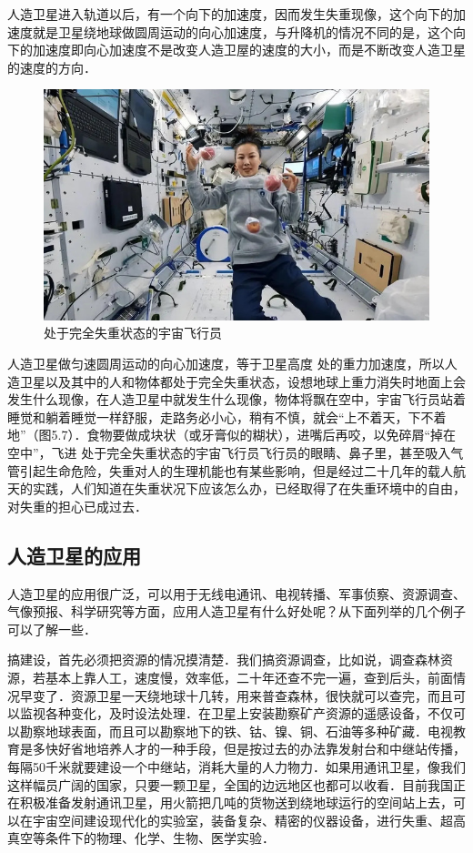 人造卫星进入轨道以后，有一个向下的加速度，因而发生失重现像，这个向下的加速度就是卫星绕地球做圆周运动的向心加速度，与升降机的情况不同的是，这个向下的加速度即向心加速度不是改变人造卫屋的速度的大小，而是不断改变人造卫星的速度的方向．

\begin{figure}[H]
	\centering\includegraphics[scale=0.8]{figure/5-7.jpg}
	\caption{处于完全失重状态的宇宙飞行员}
\end{figure}

人造卫星做匀速圆周运动的向心加速度，等于卫星高度
处的重力加速度，所以人造卫星以及其中的人和物体都处于完全失重状态，设想地球上重力消失时地面上会发生什么现像，在人造卫星中就发生什么现像，物体将飘在空中，宇宙飞行员站着睡觉和躺着睡觉一样舒服，走路务必小心，稍有不慎，就会“上不着天，下不着地”（图5.7）．食物要做成块状（或牙膏似的糊状），进嘴后再咬，以免碎屑“掉在空中”，飞进
处于完全失重状态的宇宙飞行员飞行员的眼睛、鼻子里，甚至吸入气管引起生命危险，失重对人的生理机能也有某些影响，但是经过二十几年的载人航天的实践，人们知道在失重状况下应该怎么办，已经取得了在失重环境中的自由，对失重的担心已成过去．

\subsection{人造卫星的应用}

人造卫星的应用很广泛，可以用于无线电通讯、电视转播、军事侦察、资源调查、气像预报、科学研究等方面，应用人造卫星有什么好处呢？从下面列举的几个例子可以了解一些．

搞建设，首先必须把资源的情况摸清楚．我们搞资源调查，比如说，调查森林资源，若基本上靠人工，速度慢，效率低，二十年还查不完一遍，查到后头，前面情况早变了．资源卫星一天绕地球十几转，用来普查森林，很快就可以查完，而且可
以监视各种变化，及时设法处理．在卫星上安装勘察矿产资源的遥感设备，不仅可以勘察地球表面，而且可以勘察地下的铁、钴、镍、铜、石油等多种矿藏．电视教育是多快好省地培养人才的一种手段，但是按过去的办法靠发射台和中继站传播，每隔50千米就要建设一个中继站，消耗大量的人力物力．如果用通讯卫星，像我们这样幅员广阔的国家，只要一颗卫星，全国的边远地区也都可以收看．目前我国正在积极准备发射通讯卫星，用火箭把几吨的货物送到绕地球运行的空间站上去，可以在宇宙空间建设现代化的实验室，装备复杂、精密的仪器设备，进行失重、超高真空等条件下的物理、化学、生物、医学实验．

